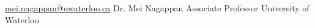 

\begin{cventries}

  \cventry
    {\href{mailto:mei.nagappan@uwaterloo.ca}{mei.nagappan@uwaterloo.ca}} %
    {Dr. Mei Nagappan} %
    {Associate Professor} %
    {University of Waterloo} %

\end{cventries}
